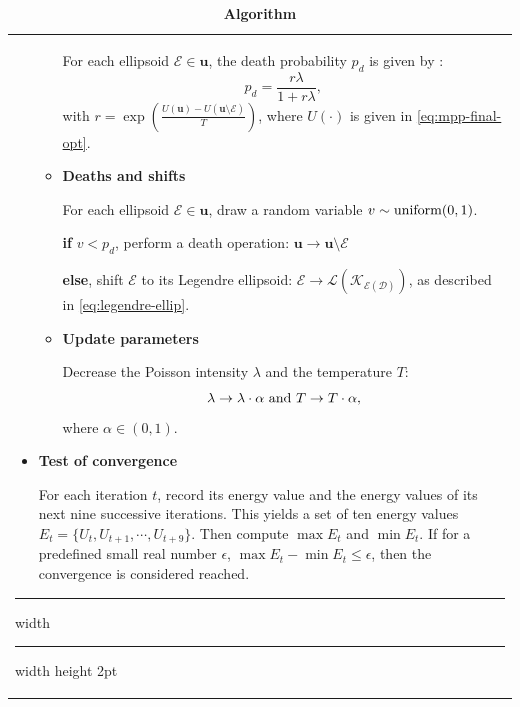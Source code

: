 \documentclass[journal]{IEEEtran}
\begin{document}
\begin{table}[!htb]
\begin{center}
\begin{tabular}{ m{8.8cm} }
\begin{itemize}
\begin{itemize}
          For each ellipsoid $\mathcal{E} \in \mathbf{u}$, the death
          probability $p_d$ is given by \cite{descombes2009object}:
          \begin{equation}
            \label{eq:mbds-death-pr}
            p_d = \frac{r\lambda}{1 + r\lambda},
          \end{equation}
          with
          $r = \exp \left( \frac{ U(\mathbf{u}) - U(\mathbf{u}
              \setminus \mathcal{E}) }{T} \right)$, where $U(\cdot)$
          is given in \eqref{eq:mpp-final-opt}.

        \item \textbf{Deaths and shifts}

          For each ellipsoid $\mathcal{E} \in \mathbf{u}$, draw a
          random variable $v \sim \textnormal{uniform}(0, 1)$.

          \textbf{if} $v < p_d$, perform a death operation:
          $\mathbf{u} \rightarrow \mathbf{u} \setminus \mathcal{E}$

          \textbf{else}, shift $\mathcal{E}$ to its Legendre
          ellipsoid:
          $\mathcal{E} \rightarrow
          \mathcal{L(K_{\mathcal{E}(\mathcal{D})})}$, as described in
          \eqref{eq:legendre-ellip}.

        \item \textbf{Update parameters}

          Decrease the Poisson intensity $\lambda$ and the temperature
          $T$:
          \begin{equation}
            \label{eq:mbds-decrease}
            \lambda \rightarrow \lambda \cdot \alpha \textnormal{ and
            } T \rightarrow T \cdot \alpha,
          \end{equation}
          where $\alpha \in \left( 0, 1 \right)$.

        \end{itemize}

      \item \textbf{Test of convergence}

        For each iteration $t$, record its energy value and the energy
        values of its next nine successive iterations. This yields a
        set of ten energy values
        $E_t = \{U_t, U_{t+1}, \cdots, U_{t+9}\}$. Then compute
        $\max E_t$ and $\min E_t$. If for a predefined small real
        number $\epsilon$, $\max E_t - \min E_t \leq \epsilon$, then
        the convergence is considered reached.

      \end{itemize}
      \vspace{0.3em}
      \hrule width \hsize \kern 0.5mm \hrule width \hsize height 2pt

    \end{tabular}

    \caption{\textbf{Algorithm \thetable}}
    \label{algo-mbds}
  \end{center}
\end{table}
\end{document}
